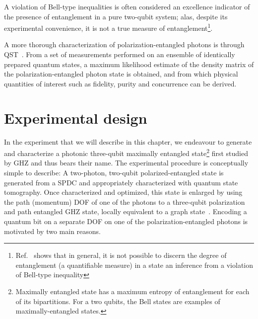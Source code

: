 \bigskip
\noindent
A violation of Bell-type inequalities is often considered an excellence indicator of the presence of entanglement in a pure two-qubit system; alas, despite its experimental convenience, it is not a true measure of entanglement\footnote{Ref.~\cite{Munro_2001} shows that in general, it is not possible to discern the degree of entanglement (a quantifiable measure) in a state \via an inference from a violation of Bell-type inequality}. 

\clearpage
\noindent
A more thorough characterization of polarization-entangled photons is through \gls{QST}~\cite{Hradil_1997, James_2001}. From a set of measurements performed on an ensemble of identically prepared quantum states, a maximum likelihood estimate of the density matrix of the polarization-entangled photon state is obtained, and from which physical quantities of interest such as fidelity, purity and concurrence can be derived.

\section{Experimental design}

In the experiment that we will describe in this chapter, we endeavour to generate and characterize a photonic three-qubit maximally entangled state\footnote{Maximally entangled state has a maximum entropy of entanglement for each of its bipartitions. For a two qubits, the Bell states are examples of maximally-entangled states.} first studied by \gls{GHZ} and thus bears their name. The experimental procedure is conceptually simple to describe: A two-photon, two-qubit polarized-entangled state is generated from a \acs{SPDC} and appropriately characterized with quantum state tomography. Once characterized and optimized, this state is enlarged by using the path (momentum) \acs{DOF} of one of the photons to a three-qubit polarization and path entangled \acs{GHZ} state, locally equivalent to a graph state~\cite{Raussendorf_2003}. Encoding a quantum bit on a separate \acs{DOF} on one of the polarization-entangled photons is motivated by two main reasons.

